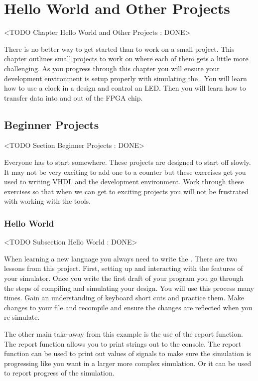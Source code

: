 \chapter{Hello World and Other Projects}
	<TODO Chapter Hello World and Other Projects : DONE>

There is no better way to get started than to work on a small project. This chapter outlines small projects to work on where each of them gets a little more challenging. As you progress through this chapter you will ensure your development environment is setup properly with simulating the . You will learn how to use a clock in a design and control an \ac{LED}. Then you will learn how to transfer data into and out of the \ac{FPGA} chip. 
	
\section{Beginner Projects}
	<TODO Section Beginner Projects : DONE>

Everyone has to start somewhere. These projects are designed to start off slowly. It may not be very exciting to add one to a counter but these exercises get you used to writing \ac{VHDL} and the development environment. Work through these exercises so that when we can get to exciting projects you will not be frustrated with working with the tools. 
	
\subsection{Hello World}
	<TODO Subsection Hello World : DONE>

When learning a new language you always need to write the . There are two lessons from this project. First, setting up and interacting with the features of your simulator. Once you write the first draft of your program you go through the steps of compiling and simulating your design. You will use this process many times. Gain an understanding of keyboard short cuts and practice them. Make changes to your file and recompile and ensure the changes are reflected when you re-simulate.

The other main take-away from this example is the use of the report function. The report function allows you to print strings out to the console. The report function can be used to print out values of signals to make sure the simulation is progressing like you want in a larger more complex simulation. Or it can be used to report progress of the simulation.      

